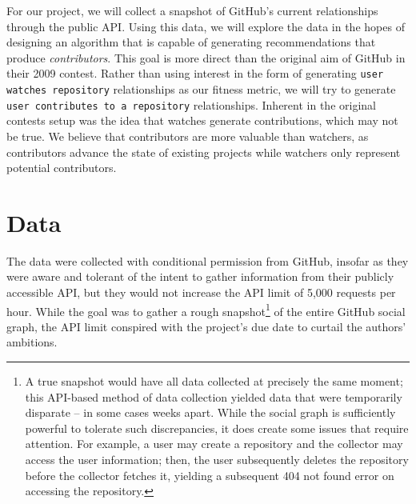 \documentclass{article}
\begin{document}
  For our project, we will collect a snapshot of GitHub's current relationships through the public API. Using this data, we will explore the data in the hopes of designing an algorithm that is capable of generating recommendations that produce \emph{contributors}. This goal is more direct than the original aim of GitHub in their 2009 contest. Rather than using interest in the form of generating {\tt user watches repository} relationships as our fitness metric, we will try to generate {\tt user contributes to a repository} relationships. Inherent in the original contests setup was the idea that watches generate contributions, which may not be true. We believe that contributors are more valuable than watchers, as contributors advance the state of existing projects while watchers only represent potential contributors.

  \section{Data}

  The data were collected with conditional permission from GitHub, insofar as they were aware and tolerant of the intent to gather information from their publicly accessible API\cite{githubapi}, but they would not increase the API limit of 5,000 requests per hour. While the goal was to gather a rough snapshot\footnote{A true snapshot would have all data collected at precisely the same moment; this API-based method of data collection yielded data that were temporarily disparate -- in some cases weeks apart. While the social graph is sufficiently powerful to tolerate such discrepancies, it does create some issues that require attention. For example, a user may create a repository and the collector may access the user information; then, the user subsequently deletes the repository before the collector fetches it, yielding a subsequent 404 not found error on accessing the repository.} of the entire GitHub social graph, the API limit conspired with the project's due date to curtail the authors' ambitions.
\end{document}
